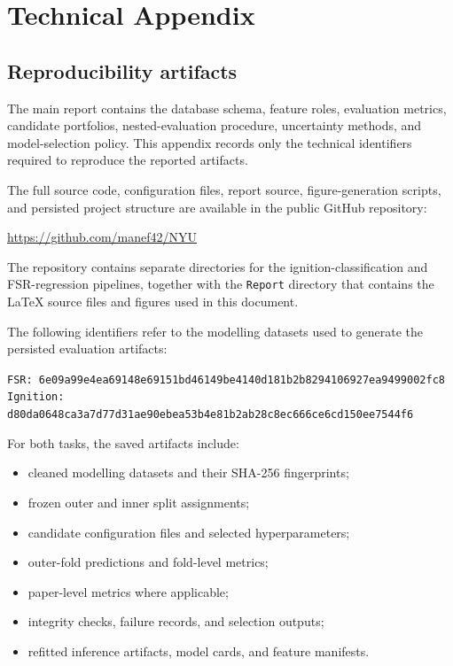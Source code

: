\chapter{Technical Appendix}
\label{chap:appendices}

\section{Reproducibility artifacts}
\label{app:reproducibility}

The main report contains the database schema, feature roles, evaluation metrics,
candidate portfolios, nested-evaluation procedure, uncertainty methods, and
model-selection policy. This appendix records only the technical identifiers
required to reproduce the reported artifacts.

The full source code, configuration files, report source, figure-generation
scripts, and persisted project structure are available in the public GitHub
repository:

\begin{center}
\url{https://github.com/manef42/NYU}
\end{center}

The repository contains separate directories for the ignition-classification
and FSR-regression pipelines, together with the \texttt{Report} directory that
contains the \LaTeX{} source files and figures used in this document.

The following identifiers refer to the modelling datasets used to generate the
persisted evaluation artifacts:

\begin{center}
\scriptsize
\texttt{FSR: 6e09a99e4ea69148e69151bd46149be4140d181b2b8294106927ea9499002fc8}\\
\texttt{Ignition: d80da0648ca3a7d77d31ae90ebea53b4e81b2ab28c8ec666ce6cd150ee7544f6}
\end{center}

For both tasks, the saved artifacts include:

\begin{itemize}
  \item cleaned modelling datasets and their SHA-256 fingerprints;
  \item frozen outer and inner split assignments;
  \item candidate configuration files and selected hyperparameters;
  \item outer-fold predictions and fold-level metrics;
  \item paper-level metrics where applicable;
  \item integrity checks, failure records, and selection outputs;
  \item refitted inference artifacts, model cards, and feature manifests.
\end{itemize}

